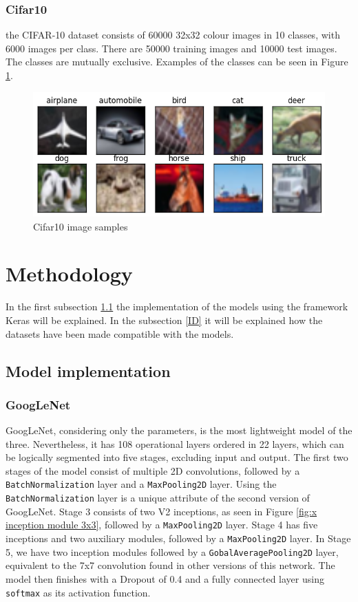 \documentclass[conference]{IEEEtran}
\begin{document}
\subsubsection{Cifar10}
the CIFAR-10 dataset consists of 60000 32x32 colour images in 10 classes, with 6000 images per class. 
There are 50000 training images and 10000 test images. 
The classes are mutually exclusive.\cite{noauthor_cifar-10_nodate} 
Examples of the classes can be seen in Figure \ref{fig:x Cifar10 image samples}.
\begin{figure}[!htbp]
    \centering
    \includegraphics[scale=0.45]{img/cifar_10_sample.png}
    \caption{Cifar10 image samples \cite{noauthor_fig_nodate}}
    \label{fig:x Cifar10 image samples}
\end{figure}

\section{Methodology}\label{C3}
In the first subsection \ref{IM} the implementation of the models using the framework Keras will be explained.
In the subsection \ref{ID} it will be explained how the datasets have been made compatible with the models.
\subsection{Model implementation}\label{IM}
\subsubsection{GoogLeNet}
GoogLeNet, considering only the parameters, is the most lightweight model of the three. 
Nevertheless, it has 108 operational layers ordered in 22 layers, which can be logically segmented into five stages, excluding input and output. 
The first two stages of the model consist of multiple 2D convolutions, followed by a \verb|BatchNormalization| layer and a \verb|MaxPooling2D| layer. 
Using the \verb|BatchNormalization| layer is a unique attribute of the second version of GoogLeNet.
Stage 3 consists of two V2 inceptions, as seen in Figure \ref{fig:x inception module 3x3}, followed by a \verb|MaxPooling2D| layer.
Stage 4 has five inceptions and two auxiliary modules, followed by a \verb|MaxPooling2D| layer. 
In Stage 5, we have two inception modules followed by a \verb|GobalAveragePooling2D| layer, equivalent to the 7x7 convolution found in other versions of this network.
The model then finishes with a Dropout of 0.4 and a fully connected layer using \verb|softmax| as its activation function.
\cite{szegedy_rethinking_2015}
\end{document}
